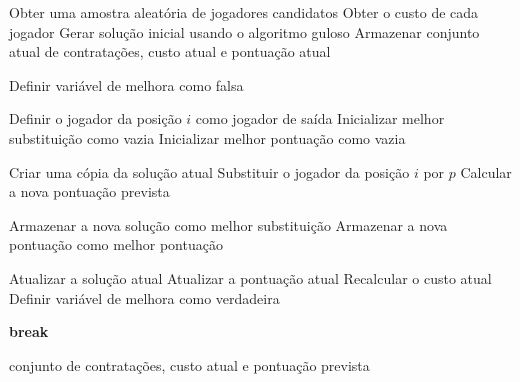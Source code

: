 \begin{algorithm}[H]
\caption{Busca Local com estratégia Best Improvement}
\label{alg:busca_local_best}
\begin{algorithmic}

\State Obter uma amostra aleatória de jogadores candidatos
\State Obter o custo de cada jogador
\State Gerar solução inicial usando o algoritmo guloso
\State Armazenar conjunto atual de contratações, custo atual e pontuação atual

    \State Definir variável de melhora como falsa

        \State Definir o jogador da posição $i$ como jogador de saída
        \State Inicializar melhor substituição como vazia
        \State Inicializar melhor pontuação como vazia

                \State Criar uma cópia da solução atual
                \State Substituir o jogador da posição $i$ por $p$
                \State Calcular a nova pontuação prevista

                    \State Armazenar a nova solução como melhor substituição
                    \State Armazenar a nova pontuação como melhor pontuação
                \EndIf
            \EndIf
        \EndFor

            \State Atualizar a solução atual
            \State Atualizar a pontuação atual
            \State Recalcular o custo atual
            \State Definir variável de melhora como verdadeira
        \EndIf

            \State \textbf{break}
        \EndIf
    \EndFor
\EndWhile

\State \Return conjunto de contratações, custo atual e pontuação prevista

\end{algorithmic}
\end{algorithm}